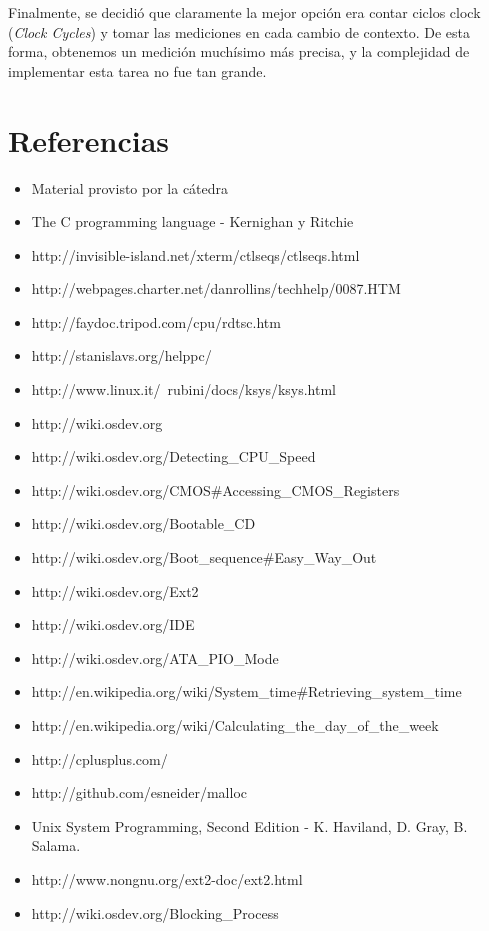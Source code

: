 \documentclass[a4paper,10pt]{article}
\begin{document}
      Finalmente, se decidió que claramente la mejor opción era contar ciclos clock (\textit{Clock Cycles}) y tomar las mediciones en cada cambio de contexto.
      De esta forma, obtenemos un medición muchísimo más precisa, y la complejidad de implementar esta tarea no fue tan grande.

\newpage     
\section{Referencias}

\begin{itemize}
  \item Material provisto por la cátedra
  \item The C programming language - Kernighan y Ritchie
  \item http://invisible-island.net/xterm/ctlseqs/ctlseqs.html
  \item http://webpages.charter.net/danrollins/techhelp/0087.HTM
  \item http://faydoc.tripod.com/cpu/rdtsc.htm
  \item http://stanislavs.org/helppc/
  \item http://www.linux.it/~rubini/docs/ksys/ksys.html
  \item http://wiki.osdev.org
  \item http://wiki.osdev.org/Detecting\_CPU\_Speed
  \item	http://wiki.osdev.org/CMOS\#Accessing\_CMOS\_Registers
  \item http://wiki.osdev.org/Bootable\_CD
  \item http://wiki.osdev.org/Boot\_sequence\#Easy\_Way\_Out
  \item http://wiki.osdev.org/Ext2
  \item http://wiki.osdev.org/IDE
  \item http://wiki.osdev.org/ATA\_PIO\_Mode
  \item http://en.wikipedia.org/wiki/System\_time\#Retrieving\_system\_time
  \item http://en.wikipedia.org/wiki/Calculating\_the\_day\_of\_the\_week
  \item http://cplusplus.com/
  \item http://github.com/esneider/malloc
  \item Unix System Programming, Second Edition - K. Haviland, D. Gray, B. Salama.
  \item http://www.nongnu.org/ext2-doc/ext2.html
  \item http://wiki.osdev.org/Blocking\_Process

\end{itemize}
\end{document}
